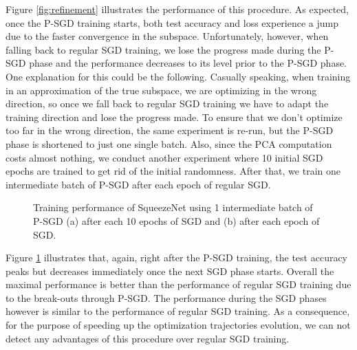 \documentclass[11pt, a4paper]{article}
\begin{document}
Figure \ref{fig:refinement} illustrates the performance of this procedure. As expected, once the P-SGD training starts, both test accuracy and loss experience a jump due to the faster convergence in the subspace. Unfortunately, however, when falling back to regular SGD training, we lose the progress made during the P-SGD phase and the performance decreases to its level prior to the P-SGD phase. One explanation for this could be the following. Casually speaking, when training in an approximation of the true subspace, we are optimizing in the wrong direction, so once we fall back to regular SGD training we have to adapt the training direction and lose the progress made. To ensure that we don't optimize too far in the wrong direction, the same experiment is re-run, but the P-SGD phase is shortened to just one single batch. Also, since the PCA computation costs almost nothing, we conduct another experiment where 10 initial SGD epochs are trained to get rid of the initial randomness. After that, we train one intermediate batch of P-SGD after each epoch of regular SGD.

\begin{figure}[!h]
\centering
{}
\parbox{14.5cm}{\centering \caption{\centering Training performance of SqueezeNet using 1 intermediate batch of P-SGD (a) after each 10 epochs of SGD and (b) after each epoch of SGD. \label{fig:refinement2}}}
\end{figure}

Figure \ref{fig:refinement2} illustrates that, again, right after the P-SGD training, the test accuracy peaks but decreases immediately once the next SGD phase starts. Overall the maximal performance is better than the performance of regular SGD training due to the break-outs through P-SGD. The performance during the SGD phases however is similar to the performance of regular SGD training. As a consequence, for the purpose of speeding up the optimization trajectories evolution, we can not detect any advantages of this procedure over regular SGD training.
\end{document}
